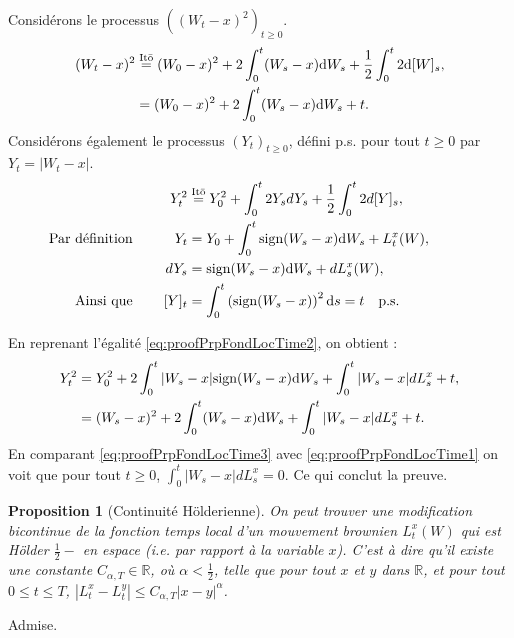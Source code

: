 \documentclass[openany]{book}
\makeatletter
\newcommand{\R}{\mathbb{R}}
\newcommand{\1}{\mathbbm{1}}
\newcommand{\sign}{\text{sign}}
\renewcommand{\d}{\mathrm{d}}
\renewenvironment{proof}[1][\textbf{\textit{Démonstration}}]{%
  \par\pushQED{\qed}%
  \normalfont\topsep6\p@\@plus6\p@\relax
  \trivlist\item[\hskip\labelsep
    #1\@addpunct{.}]\ignorespaces
}{%
  \popQED\endtrivlist\@endpefalse
}
\theoremstyle{thmfont}
\theoremstyle{deffont}
\theoremstyle{thmfont}
\newtheorem{prop}[prop]{Proposition}
\theoremstyle{deffont}
\makeatother
\begin{document}
\begin{proof}
    Considérons le processus $\left((W_t - x)^2\right)_{t\geq0}$.
    \begin{align}
      (W_t -x)^2 &\overset{\text{Itō}}{=} (W_0-x)^2 + 2\int_0^t (W_s -x)\d W_s + \dfrac{1}{2} \int_0^t 2 \d [W]_s,\notag\\
                 &= (W_0-x)^2 + 2\int_0^t (W_s -x)\d W_s + t. \label{eq:proofPrpFondLocTime1}
    \end{align}
    \noindent Considérons également le processus $(Y_t)_{t\geq0}$, défini p.s. pour tout $t\geq0$ par $Y_t = |W_t-x|$.
    \begin{alignat}{2}
     && Y_t^2 &\overset{\text{Itō}}{=} Y_0^2 + \int_0^t 2Y_s dY_s + \dfrac{1}{2} \int_0^t 2 d[Y]_s, \label{eq:proofPrpFondLocTime2} \\
     \text{Par définition}&&\qquad Y_t &= Y_0 + \int_0^t \sign(W_s -x) \d W_s + L_t^x(W),\quad\qquad\notag\\
     && dY_s &=  \sign(W_s -x) \d W_s + dL_s^x(W),\quad\notag\\
     \text{Ainsi que}&& [Y]_t &= \int_0^t \left(\sign(W_s-x)\right)^2 \d s = t \quad\text{p.s.}\notag\\
    \end{alignat}
    

    \noindent En reprenant l’égalité \eqref{eq:proofPrpFondLocTime2}, on obtient :
    \begin{align}
      Y_t^2 &= Y_0^2 + 2\int_0^t |W_s - x| \sign(W_s-x) \d W_s + \int_0^t |W_s-x| dL_s^x + t,\notag\\
      &= (W_s -x)^2 + 2\int_0^t (W_s -x) \d W_s + \int_0^t |W_s -x| dL_s^x + t. \label{eq:proofPrpFondLocTime3}
    \end{align}
    En comparant \eqref{eq:proofPrpFondLocTime3} avec \eqref{eq:proofPrpFondLocTime1} on voit que pour tout $t\geq0$, $\int_0^t |W_s-x|dL_s^x = 0$. Ce qui conclut la preuve.
\end{proof}


  \begin{prop}[Continuité Hölderienne]
    On peut trouver une modification bicontinue de la fonction temps local d'un mouvement brownien $L_t^x(W)$ qui est Hölder $\frac{1}{2}-$ en espace (i.e. par rapport à la variable $x$). C'est à dire qu'il existe une constante $C_{\alpha,T} \in \R$, où $\alpha < \frac{1}{2}$, telle que pour tout $x$ et $y$ dans $\R$, et pour tout $0\leq t \leq T$, $|L_t^x - L_t^y|\leq C_{\alpha,T}|x - y|^\alpha$.
  \end{prop}
  \begin{proof}
    Admise.
  \end{proof}
\end{document}
